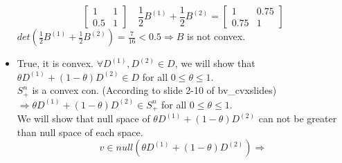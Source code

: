 \documentclass[a4paper]{article}
\begin{document}
\begin{latin}
\begin{itemize}
\begin{equation*}
\begin{bmatrix}
			1 & 1 \\
			0.5 & 1
		\end{bmatrix}
		\quad
		\frac{1}{2} B^{(1)} + \frac{1}{2} B^{(2)} = 
		\begin{bmatrix}
			1 & 0.75 \\
			0.75 & 1
		\end{bmatrix}
	\end{equation*}
	$ det(\frac{1}{2} B^{(1)} + \frac{1}{2} B^{(2)}) = \frac{7}{16} < 0.5 \Rightarrow B $ is not convex.
	\item 
	True, it is convex. $ \forall D^{(1)}, D^{(2)} \in D $, we will show that $ \theta D^{(1)} + (1-\theta) D^{(2)} \in D $ for all $ 0 \leq \theta \leq 1 $.
	\\
	$ S_{+}^{n}  $ is a convex con. (According to slide 2-10 of bv\_cvxslides) $ \Rightarrow \theta D^{(1)} + (1-\theta) D^{(2)} \in S_{+}^{n} $ for all $ 0 \leq \theta \leq 1 $.
	\\
	We will show that null space of $ \theta D^{(1)} + (1-\theta) D^{(2)} $ can not be greater than null space of each space. 
	\begin{equation*}
		v \in null(\theta D^{(1)} + (1-\theta) D^{(2)}) \Rightarrow 
	\end{equation*}
	
\end{itemize}


\end{latin}
\end{document}
